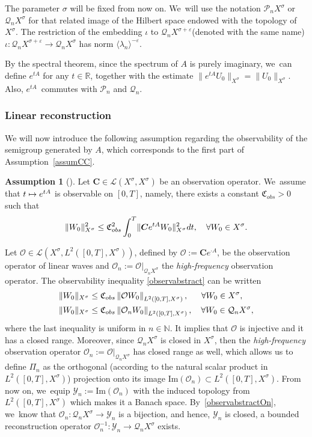 \documentclass[11pt]{article}
\newcommand\mto{\mathchoice{\longmapsto}{\mapsto}{\mapsto}{\mapsto}}
\theoremstyle{definition}
\newtheorem{assum}{Assumption}
\newenvironment{assump}[2][]
{\renewcommand\theassum{#2}\begin{assum}[#1]}
{\end{assum}}
\let\mc\mathcal
\let\veps\varepsilon
\renewcommand{\O}{\mc{O}}
\newcommand{\Y}{\mc{Y}}
\newcommand{\R}{\mathbb{R}}
\newcommand{\N}{\mathbb{N}}
\newcommand{\Q}{\mathcal{Q}}
\renewcommand{\P}{\mathcal{P}}
\newcommand{\bC}{\boldsymbol{C}}
\providecommand{\norm}[1]{\lVert#1\rVert}
\providecommand{\inn}[1]{\langle#1\rangle}
\newcommand\nor[2]{\left\|#1\right\|_{#2}}
\begin{document}
The parameter $\sigma$ will be fixed from now on. We~will use the notation $\P_n X^{\sigma}$ or $\Q_n X^{\sigma}$ for that related image of the Hilbert space endowed with the topology of~$X^{\sigma}$. The restriction of the embedding $\iota$ to $\Q_n X^{\sigma+\veps}$(denoted with the same name) $\iota: \Q_n X^{\sigma+\veps}\to \Q_nX^{\sigma}$ has norm $\inn{\lambda_n}^{-\veps}$.

By the spectral theorem, since the spectrum of $A$ is purely imaginary, we~can define $e^{tA}$ for any $t\in \R$, together with the estimate $\norm{e^{tA}U_0}_{X^{\sigma}}=\norm{U_0}_{X^{\sigma}}$. Also, $e^{tA}$~commutes with $\P_n$ and $\Q_n$.

\subsubsection{Linear reconstruction} We will now introduce the following assumption regarding the observability of the semigroup generated by $A$, which corresponds to the first part of Assumption~\ref{assumCC}.
\begin{assump}{2a}
\label{assumC}Let $\bC\in\mc{L}(X^\sigma, X^\sigma)$ be an observation operator. We~assume that $t\mto e^{tA}$ is observable on $[0,T]$, namely, there exists a constant $\mathfrak{C}_{obs}>0$ such that
\begin{align}\label{observabstract}
\norm{W_0}_{X^\sigma}^2\leq \mathfrak{C}_{\textup{obs}}^2\int_0^T \norm{\bC e^{tA}W_0}_{X^\sigma}^2dt,\quad \forall W_0\in X^\sigma.
\end{align}
\end{assump}
Let $\mc{O}\in \mc{L}(X^\sigma, L^2([0, T], X^\sigma))$, defined by $\mc{O}:=\bC e^{\cdot A}$, be the observation operator of linear waves and $\mc{O}_n:=\mc{O}|_{\Q_nX^\sigma}$ the \emph{high-frequency} observation operator. The observability inequality \eqref{observabstract} can be written
\begin{align}\label{observabstractO}
\norm{W_0}_{X^\sigma}&\leq \mathfrak{C}_{\textup{obs}}\nor{\O W_{0}}{L^{2}([0,T],X^\sigma)},\quad\;\; \forall W_0\in X^\sigma,\\
\label{observabstractOn} \norm{W_0}_{X^\sigma}&\leq \mathfrak{C}_{\textup{obs}}\nor{\O_{n} W_{0}}{L^{2}([0,T],X^\sigma)},\quad \forall W_0\in \Q_n X^\sigma,
\end{align}
where the last inequality is uniform in $n\in \N$.
It implies that $\mc{O}$ is injective and it has a closed range. Moreover, since $\Q_nX^\sigma$ is closed in $X^\sigma$, then the \emph{high-frequency} observation operator $\mc{O}_n:=\mc{O}|_{\Q_nX^\sigma}$ has closed range as well, which allows us to define $\Pi_n$ as the orthogonal (according to the natural scalar product in $L^2([0, T], X^\sigma)$) projection onto its image $\text{Im}(\mc{O}_n)\subset L^2([0, T], X^\sigma)$. From now on, we~equip $\Y_n:=\text{Im}(\O_n)$ with the induced topology from $L^2([0, T], X^\sigma)$ which makes it a Banach space. By~\eqref{observabstractOn}, we~know that $\O_n: \Q_n X^\sigma\to \Y_n$ is a bijection, and hence, $\Y_n$ is closed, a bounded reconstruction operator $\O_n^{-1}: \Y_n\to \Q_n X^\sigma$ exists.
\end{document}
